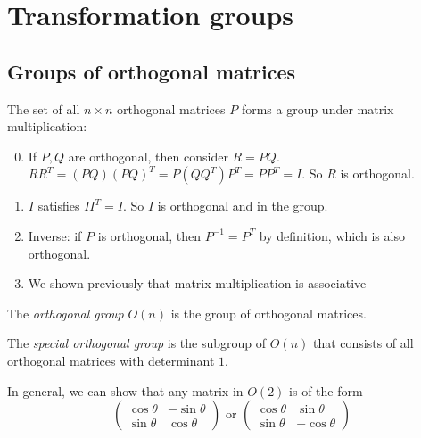 \documentclass[a4paper]{article}
\begin{document}
      \section{Transformation groups}
      \subsection{Groups of orthogonal matrices}
      \begin{prop}
        The set of all $n\times n$ orthogonal matrices $P$ forms a group under matrix multiplication:
        \begin{enumerate}[label=\arabic{*}.]
            \setcounter{enumi}{-1}
          \item If $P, Q$ are orthogonal, then consider $R = PQ$. $RR^T = (PQ)(PQ)^T = P(QQ^T)P^T = PP^T = I$. So $R$ is orthogonal.
          \item $I$ satisfies $II^T = I$. So $I$ is orthogonal and in the group.
          \item Inverse: if $P$ is orthogonal, then $P^{-1}=P^T$ by definition, which is also orthogonal.
          \item We shown previously that matrix multiplication is associative
        \end{enumerate}
      \end{prop}

      \begin{defi}
        The \emph{orthogonal group} $O(n)$ is the group of orthogonal matrices.
      \end{defi}

      \begin{defi}
        The \emph{special orthogonal group} is the subgroup of $O(n)$ that consists of all orthogonal matrices with determinant $1$.
      \end{defi}

      In general, we can show that any matrix in $O(2)$ is of the form
      \[
        \begin{pmatrix}
          \cos\theta & -\sin\theta\\
          \sin\theta & \cos\theta
        \end{pmatrix}\text{ or }
        \begin{pmatrix}
          \cos\theta & \sin\theta\\
          \sin\theta & -\cos\theta
        \end{pmatrix}
      \]
\end{document}
